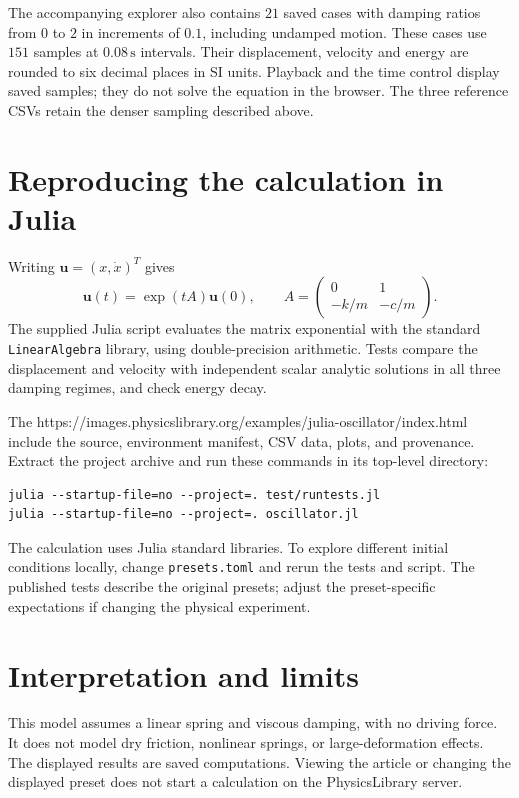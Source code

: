 The accompanying explorer also contains $21$ saved cases with damping ratios
from $0$ to $2$ in increments of $0.1$, including undamped motion. These cases
use $151$ samples at $0.08\,\mathrm{s}$ intervals. Their displacement, velocity
and energy are rounded to six decimal places in SI units. Playback and the
time control display saved samples; they do not solve the equation in the
browser. The three reference CSVs retain the denser sampling described above.

\section{Reproducing the calculation in Julia}
Writing $\mathbf{u}=(x,\dot{x})^{T}$ gives
\begin{equation}
 \mathbf{u}(t)=\exp(tA)\mathbf{u}(0),\qquad
 A=\begin{pmatrix}0&1\\-k/m&-c/m\end{pmatrix}.
\end{equation}
The supplied Julia script evaluates the matrix exponential with the standard
\texttt{LinearAlgebra} library, using double-precision arithmetic. Tests compare
the displacement and velocity with independent scalar analytic solutions in
all three damping regimes, and check energy decay.

The 
{https://images.physicslibrary.org/examples/julia-oscillator/index.html}
include the source, environment manifest, CSV data, plots, and provenance.
Extract the project archive and run these commands in its top-level directory:
\begin{verbatim}
julia --startup-file=no --project=. test/runtests.jl
julia --startup-file=no --project=. oscillator.jl
\end{verbatim}
The calculation uses Julia standard libraries. To explore different initial
conditions locally, change \texttt{presets.toml} and rerun the tests and script.
The published tests describe the original presets; adjust the preset-specific
expectations if changing the physical experiment.

\section{Interpretation and limits}
This model assumes a linear spring and viscous damping, with no driving force.
It does not model dry friction, nonlinear springs, or large-deformation effects.
The displayed results are saved computations. Viewing the article or changing
the displayed preset does not start a calculation on the PhysicsLibrary server.
